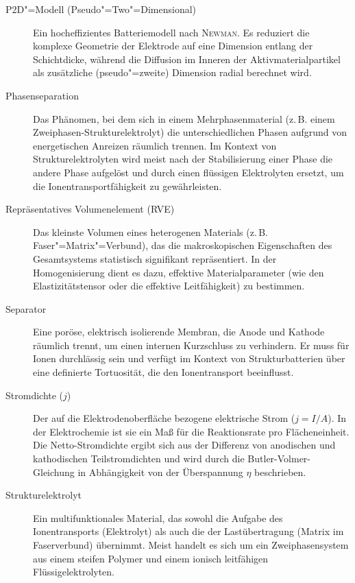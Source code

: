 \begin{description}
    \item[P2D"=Modell (Pseudo"=Two"=Dimensional)] Ein hocheffizientes Batteriemodell nach \textsc{Newman}. Es reduziert die komplexe Geometrie der Elektrode auf eine Dimension entlang der Schichtdicke, während die Diffusion im Inneren der Aktivmaterialpartikel als zusätzliche (pseudo"=zweite) Dimension radial berechnet wird.
    
    \item[Phasenseparation] Das Phänomen, bei dem sich in einem Mehrphasenmaterial (z.\,B. einem Zweiphasen-Strukturelektrolyt) die unterschiedlichen Phasen aufgrund von energetischen Anreizen räumlich trennen. Im Kontext von Strukturelektrolyten wird meist nach der Stabilisierung einer Phase die andere Phase aufgelöst und durch einen flüssigen Elektrolyten ersetzt, um die Ionentransportfähigkeit zu gewährleisten.
    
    \item[Repräsentatives Volumenelement (RVE)] Das kleinste Volumen eines heterogenen Materials (z.\,B. Faser"=Matrix"=Verbund), das die makroskopischen Eigenschaften des Gesamtsystems statistisch signifikant repräsentiert. In der Homogenisierung dient es dazu, effektive Materialparameter (wie den Elastizitätstensor oder die effektive Leitfähigkeit) zu bestimmen.

    \item[Separator] Eine poröse, elektrisch isolierende Membran, die Anode und Kathode räumlich trennt, um einen internen Kurzschluss zu verhindern. Er muss für Ionen durchlässig sein und verfügt im Kontext von Strukturbatterien über eine definierte Tortuosität, die den Ionentransport beeinflusst.
    
    \item[Stromdichte ($j$)] Der auf die Elektrodenoberfläche bezogene elektrische Strom ($j = I/A$). In der Elektrochemie ist sie ein Maß für die Reaktionsrate pro Flächeneinheit. Die Netto-Stromdichte ergibt sich aus der Differenz von anodischen und kathodischen Teilstromdichten und wird durch die Butler-Volmer-Gleichung in Abhängigkeit von der Überspannung $\eta$ beschrieben.
    
    \item[Strukturelektrolyt] Ein multifunktionales Material, das sowohl die Aufgabe des Ionentransports (Elektrolyt) als auch die der Lastübertragung (Matrix im Faserverbund) übernimmt. Meist handelt es sich um ein Zweiphasensystem aus einem steifen Polymer und einem ionisch leitfähigen Flüssigelektrolyten.
    

\end{description}
